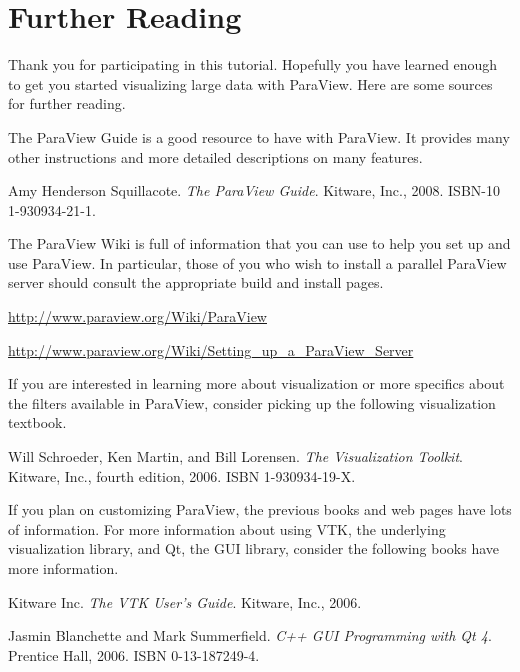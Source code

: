 \chapter{Further Reading}
\label{chap:FurtherReading}

Thank you for participating in this tutorial.  Hopefully you have learned
enough to get you started visualizing large data with ParaView.  Here are
some sources for further reading.

The ParaView Guide is a good resource to have with ParaView.  It provides
many other instructions and more detailed descriptions on many features.

\begin{reflist}
\item  Amy Henderson Squillacote.  \emph{The ParaView Guide}.  Kitware, Inc.,
  2008. ISBN-10 1-930934-21-1.
\end{reflist}

The ParaView Wiki is full of information that you can use to help you set
up and use ParaView.  In particular, those of you who wish to install a
parallel ParaView server should consult the appropriate build and install
pages.

\begin{reflist}
\item \href{http://www.paraview.org/Wiki/ParaView}{http://www.paraview.org/Wiki/ParaView}
\item \href{http://www.paraview.org/Wiki/Setting_up_a_ParaView_Server}{http://www.paraview.org/Wiki/Setting\_up\_a\_ParaView\_Server}
\end{reflist}

If you are interested in learning more about visualization or more
specifics about the filters available in ParaView, consider picking up the
following visualization textbook.

\begin{reflist}
\item Will Schroeder, Ken Martin, and Bill Lorensen.  \emph{The
  Visualization Toolkit}.  Kitware, Inc., fourth edition, 2006.  ISBN
  1-930934-19-X.
\end{reflist}

If you plan on customizing ParaView, the previous books and web pages have
lots of information.  For more information about using VTK, the underlying
visualization library, and Qt, the GUI library, consider the following
books have more information.

\begin{reflist}
\item Kitware Inc.  \emph{The VTK User's Guide}.  Kitware, Inc., 2006.
\item Jasmin Blanchette and Mark Summerfield.  \emph{C++ GUI Programming
  with Qt 4}.  Prentice Hall, 2006.  ISBN 0-13-187249-4.
\end{reflist}

